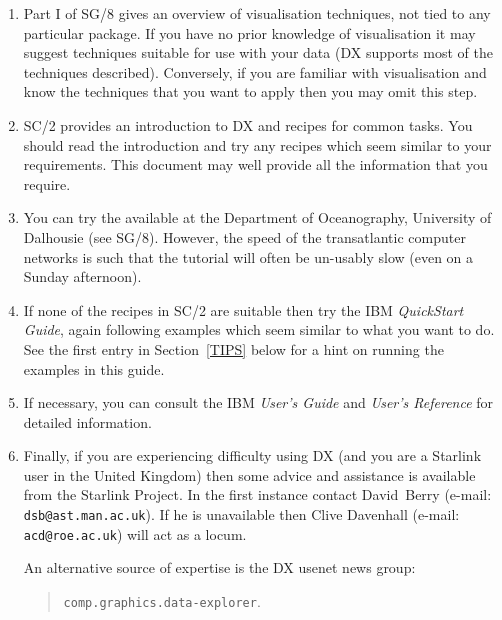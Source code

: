 \begin{enumerate}

  \item Part I of SG/8 \cite{SG8}
   gives an overview of visualisation techniques, not
   tied to any particular package. If you have no prior knowledge of
   visualisation it may suggest techniques suitable for use with your
   data (DX supports most of the techniques described). Conversely,
   if you are familiar with visualisation and know the techniques that
   you want to apply then you may omit this step.

  \item SC/2 \cite{SC2}
   provides an introduction to DX and recipes for common tasks. You
   should read the introduction and try any recipes which seem similar
   to your requirements. This document may well provide all the
   information that you require.

  \item You can try the 
   available at the Department
   of Oceanography, University of Dalhousie (see SG/8\cite{SG8}).
   However, the speed of the transatlantic computer networks is such that
   the tutorial will often be un-usably slow (even on a Sunday afternoon).

  \item If none of the recipes in SC/2\cite{SC2} are suitable then try the
   IBM {\it QuickStart Guide}\cite{QUICKS}, again following examples which
   seem similar to what you want to do. See the first entry in
   Section~\ref{TIPS} below for a hint on running the examples in this
   guide.

  \item If necessary, you can consult the IBM {\it User's
   Guide}\cite{USERG} and {\it User's Reference}\cite{USERR} for detailed
   information.

  \item Finally, if you are experiencing difficulty using DX (and you
   are a Starlink user in the United Kingdom) then some advice and
   assistance is available from the Starlink Project. In the first
   instance contact David~Berry (e-mail: {\tt{dsb@ast.man.ac.uk}}).
   If he is unavailable then Clive Davenhall (e-mail: {\tt{acd@roe.ac.uk}})
   will act as a locum.

   An alternative source of expertise is the DX usenet news group:

  \begin{quote}
   {\tt comp.graphics.data-explorer}.
  \end{quote}

\end{enumerate}


